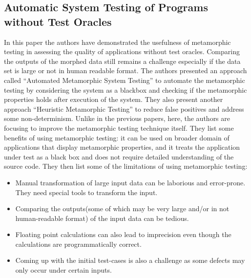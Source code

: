 	\subsection{Automatic System Testing of Programs without Test Oracles}
		In this paper the authors have demonstrated the usefulness of metamorphic testing in assessing the quality of applications without test oracles. Comparing the outputs of the morphed data still remains a challenge especially if the data set is large or not in human readable format. The authors presented an approach called ``Automated Metamorphic System Testing'' to automate the metamorphic testing by considering the system as a blackbox and checking if the metamorphic properties holds after execution of the system. They also present another approach “Heuristic Metamorphic Testing” to reduce false positives and address some non-determinism. Unlike in the previous papers, here, the authors are focusing to improve the metamorphic testing technique itself. They list some benefits of using metamorphic testing: it can be used on broader domain of applications that display metamorphic properties, and it treats the application under test as a black box and does not require detailed understanding of the source code. They then list some of the limitations of using metamorphic testing:
		\begin{itemize}
			\item	Manual transformation of large input data can be laborious and error-prone. They need special tools to transform the input.
			\item Comparing the outputs(some of which may be very large and/or in not human-readable format) of the input data can be tedious.
			\item Floating point calculations can also lead to imprecision even though the calculations are programmatically correct.
			\item Coming up with the initial test-cases is also a challenge as some defects may only occur under certain inputs.
		\end{itemize}

